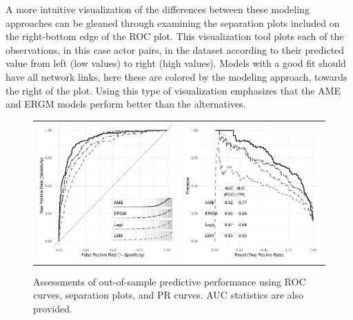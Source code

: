 A more intuitive visualization of the differences between these modeling approaches can be gleaned through examining the separation plots included on the right-bottom edge of the ROC plot. This visualization tool plots each of the observations, in this case actor pairs, in the dataset according to their predicted value from left (low values) to right (high values). Models with a good fit should have all network links, here these are colored by the modeling approach, towards the right of the plot. Using this type of visualization emphasizes that the AME and ERGM models perform better than the alternatives.

\begin{figure}[ht]
	\centering
	\caption{Assessments of out-of-sample predictive performance using ROC curves, separation plots, and PR curves. AUC statistics are also provided.}
	\begin{tabular}{cc}
	\includegraphics[width=.5\textwidth]{Figure2a_bw} & 
	\includegraphics[width=.5\textwidth]{Figure2b_bw}	
	\end{tabular}
	\label{fig:roc}
\end{figure}

